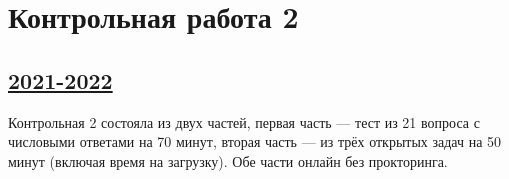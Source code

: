 \newpage
\thispagestyle{empty}
\section{Контрольная работа 2}


\subsection[2021-2022]{\hyperref[sec:sol_kr_02_2021_2022]{2021-2022}}
\label{sec:kr_02_2021_2022}

Контрольная 2 состояла из двух частей, первая часть — тест из 21 вопроса с числовыми ответами на 70 минут,
вторая часть — из трёх открытых задач на 50 минут (включая время на загрузку). 
Обе части онлайн без прокторинга. 

